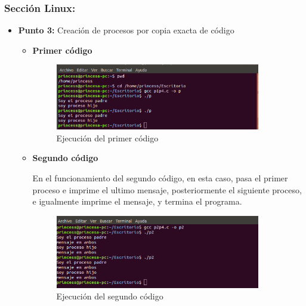 \documentclass[12pt]{article}
\begin{document}
            \subsubsection{Sección Linux:}
            \begin{itemize}
                \item[\Checkmark] \textbf{Punto 3:} Creación de procesos por copia exacta de código
                
                    \begin{itemize}
                        \item \textbf{Primer código}
                           \begin{figure}[h!]
                                \centering
                                 \includegraphics[width=0.9\textwidth]{Practica4/Images/Linux/3_1.png}
                                \caption{Ejecución del primer código}
                            \end{figure}  
                                                  \item \textbf{Segundo código}
                                                  
                            En el funcionamiento del segundo código, en esta caso, pasa el primer proceso e imprime el ultimo mensaje,  posteriormente el siguiente proceso, e igualmente imprime el mensaje,  y termina el programa.
                            \begin{figure}[h!]
                                \centering
                                \includegraphics[width=0.9\textwidth]{Practica4/Images/Linux/3_2.png}
                                \caption{Ejecución del segundo código}
                            \end{figure}


\end{itemize}
\end{itemize}
\end{document}
